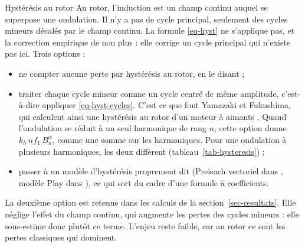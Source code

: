 \documentclass[11pt,a4paper]{article}
\begin{document}
\begin{ouvert}{Hystérésis au rotor}
Au rotor, l'induction est un champ continu auquel se superpose une ondulation. Il n'y a pas de cycle principal, seulement des cycles mineurs décalés par le champ continu. La formule \eqref{eq-hyst} ne s'applique pas, et la correction empirique de \cite{Lav78} non plus : elle corrige un cycle principal qui n'existe pas ici. Trois options :
\begin{itemize}
    \item ne compter aucune perte par hystérésis au rotor, en le disant ;
    \item traiter chaque cycle mineur comme un cycle centré de même amplitude, c'est-à-dire appliquer \eqref{eq-hyst-cycles}. C'est ce que font Yamazaki et Fukushima, qui calculent ainsi une hystérésis au rotor d'un moteur à aimants \cite[Fig.~5]{Yam10}. Quand l'ondulation se réduit à un seul harmonique de rang $n$, cette option donne $k_h\, n f_1\, B_n^{\alpha}$, comme une somme sur les harmoniques. Pour une ondulation à plusieurs harmoniques, les deux diffèrent (tableau~\ref{tab-hysteresis}) ;
    \item passer à un modèle d'hystérésis proprement dit (Preisach vectoriel dans \cite{Ras12}, modèle Play dans \cite{Car21}), ce qui sort du cadre d'une formule à coefficients.
\end{itemize}
La deuxième option est retenue dans les calculs de la section~\ref{sec-resultats}. Elle néglige l'effet du champ continu, qui augmente les pertes des cycles mineurs : elle sous-estime donc plutôt ce terme. L'enjeu reste faible, car au rotor ce sont les pertes classiques qui dominent.
\end{ouvert}
\end{document}
